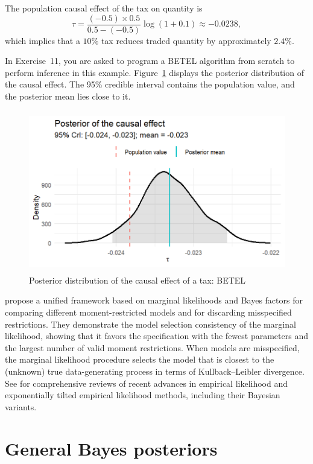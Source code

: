 The population causal effect of the tax on quantity is
\[
\tau=\frac{(-0.5)\times 0.5}{0.5-(-0.5)}\log(1+0.1)\approx -0.0238,
\]
which implies that a \(10\%\) tax reduces traded quantity by approximately \(2.4\%\).

In Exercise~11, you are asked to program a BETEL algorithm from scratch to perform inference in this example. Figure~\ref{fig12_SimCausality} displays the posterior distribution of the causal effect. The 95\% credible interval contains the population value, and the posterior mean lies close to it.

\begin{figure}[h!]
	\includegraphics[width=340pt, height=200pt]{Chapters/chapter12/figures/fig12_SimCausality.png}
	\caption[List of figure caption goes here]{Posterior distribution of the causal effect of a tax: BETEL}\label{fig12_SimCausality}
\end{figure} 
  
\cite{chib2018moment} propose a unified framework based on marginal likelihoods and Bayes factors for comparing different moment-restricted models and for discarding misspecified restrictions. They demonstrate the model selection consistency of the marginal likelihood, showing that it favors the specification with the fewest parameters and the largest number of valid moment restrictions. When models are misspecified, the marginal likelihood procedure selects the model that is closest to the (unknown) true data-generating process in terms of Kullback–Leibler divergence. See \cite{lazar2021review, liu2023review} for comprehensive reviews of recent advances in empirical likelihood and exponentially tilted empirical likelihood methods, including their Bayesian variants.

\section{General Bayes posteriors}\label{sec12_10}

